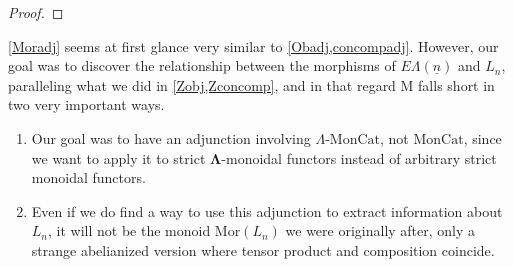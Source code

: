 \documentclass{amsbook} %
\newcommand{\ML}{\mathbf{\Lambda}}
\newcommand{\ELn}{E\Lambda(\underline{n})}
\newcommand{\lmc}{\Lambda\mbox{-}\textrm{MonCat}}
\newcommand{\moncat}{\ensuremath{\textrm{MonCat}}}
\newenvironment{eq*}{\begin{equation*}}{\end{equation*}}
\numberwithin{section}{chapter}
\begin{document}
\begin{proof}
\end{proof}

\cref{Moradj} seems at first glance very similar to \cref{Obadj,concompadj}. However, our goal was to discover the relationship between the morphisms of $\ELn$ and $L_n$, paralleling what we did in \cref{Zobj,Zconcomp}, and in that regard $\mathrm{M}$ falls short in two very important ways. 

\begin{enumerate}
\item Our goal was to have an adjunction involving $\lmc$, not $\moncat$, since we want to apply it to strict $\ML$-monoidal functors instead of arbitrary strict monoidal functors. %
\item Even if we do find a way to use this adjunction to extract information about $L_n$, it will not be the monoid $\mathrm{Mor}(L_n)$ we were originally after, only a strange abelianized version where tensor product and composition coincide.  
\end{enumerate} 
\end{document}
